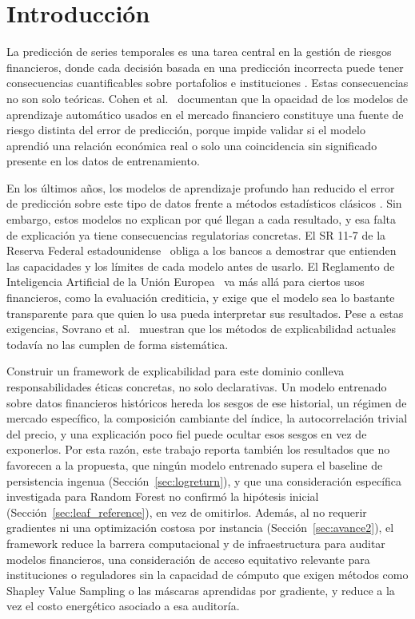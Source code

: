 \documentclass[conference, letterpaper]{IEEEtran}
\begin{document}
\section{Introducción}
\label{sec:introduccion}


La predicción de series temporales es una tarea central en la gestión de riesgos financieros, donde cada decisión basada en una predicción incorrecta puede tener consecuencias cuantificables sobre portafolios e instituciones \cite{arsenault2025}. Estas consecuencias no son solo teóricas. Cohen et al.~\cite{cohen2023blackbox} documentan que la opacidad de los modelos de aprendizaje automático usados en el mercado financiero constituye una fuente de riesgo distinta del error de predicción, porque impide validar si el modelo aprendió una relación económica real o solo una coincidencia sin significado presente en los datos de entrenamiento.

En los últimos años, los modelos de aprendizaje profundo han reducido el error de predicción sobre este tipo de datos frente a métodos estadísticos clásicos \cite{bhandari2022, abdulquadir2023}. Sin embargo, estos modelos no explican por qué llegan a cada resultado, y esa falta de explicación ya tiene consecuencias regulatorias concretas. El SR 11-7 de la Reserva Federal estadounidense~\cite{sr117} obliga a los bancos a demostrar que entienden las capacidades y los límites de cada modelo antes de usarlo. El Reglamento de Inteligencia Artificial de la Unión Europea~\cite{euaiact2024} va más allá para ciertos usos financieros, como la evaluación crediticia, y exige que el modelo sea lo bastante transparente para que quien lo usa pueda interpretar sus resultados. Pese a estas exigencias, Sovrano et al.~\cite{sovrano2026} muestran que los métodos de explicabilidad actuales todavía no las cumplen de forma sistemática.


Construir un framework de explicabilidad para este dominio conlleva responsabilidades éticas concretas, no solo declarativas. Un modelo entrenado sobre datos financieros históricos hereda los sesgos de ese historial, un régimen de mercado específico, la composición cambiante del índice, la autocorrelación trivial del precio, y una explicación poco fiel puede ocultar esos sesgos en vez de exponerlos. Por esta razón, este trabajo reporta también los resultados que no favorecen a la propuesta, que ningún modelo entrenado supera el baseline de persistencia ingenua (Sección~\ref{sec:logreturn}), y que una consideración específica investigada para Random Forest no confirmó la hipótesis inicial (Sección~\ref{sec:leaf_reference}), en vez de omitirlos. Además, al no requerir gradientes ni una optimización costosa por instancia (Sección~\ref{sec:avance2}), el framework reduce la barrera computacional y de infraestructura para auditar modelos financieros, una consideración de acceso equitativo relevante para instituciones o reguladores sin la capacidad de cómputo que exigen métodos como Shapley Value Sampling o las máscaras aprendidas por gradiente, y reduce a la vez el costo energético asociado a esa auditoría.
\end{document}
